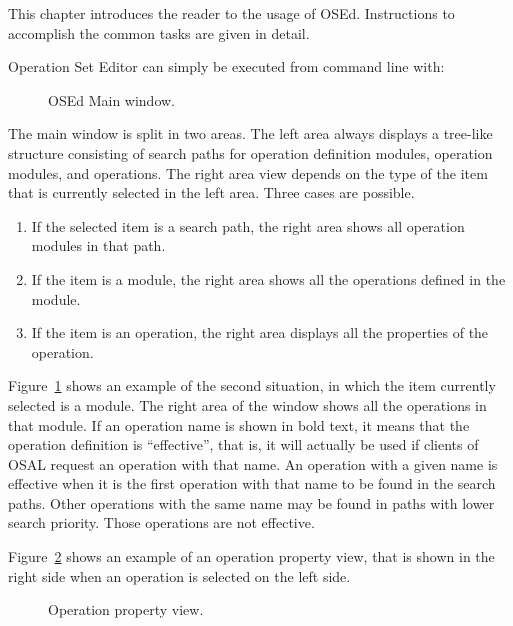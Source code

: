 \documentclass[twoside]{tceusermanual}
\begin{document}
This chapter introduces the reader to the usage of OSEd. Instructions to
accomplish the common tasks are given in detail.

Operation Set Editor can simply be executed from command line with:


\begin{figure}[tb]
\centerline{}
\caption{OSEd Main window.}
\label{fig:osed_main_window}
\end{figure}

The main window is split in two areas. The left area always displays a
tree-like structure consisting of search paths for operation definition
modules, operation modules, and operations.  The right area view depends on the
type of the item that is currently selected in the left area. Three cases are
possible.
%
\begin{enumerate}
\item %
  If the selected item is a search path, the right area shows all operation
modules in that path.
\item %
  If the item is a module, the right area shows all the operations defined
  in the module.
\item %
  If the item is an operation, the right area displays all the properties of
  the operation.
\end{enumerate}

Figure~\ref{fig:osed_main_window} shows an example of the second situation, in
which the item currently selected is a module. The right area of the window
shows all the operations in that module. If an operation name is shown in
bold text, it means that the operation definition is ``effective'', that is,
it will actually be used if clients of OSAL request an operation with that
name. An operation with a given name is effective when it is the first
operation with that name to be found in the search paths. Other operations
with the same name may be found in paths with lower search priority. Those
operations are not effective.

Figure~\ref{fig:osed_operation_property_view} shows an example of an operation 
property view, that is shown in the right side when an operation is selected 
on the left side.

\begin{figure}[tb]
\centerline{}
\caption{Operation property view.}
\label{fig:osed_operation_property_view}
\end{figure}
\end{document}
